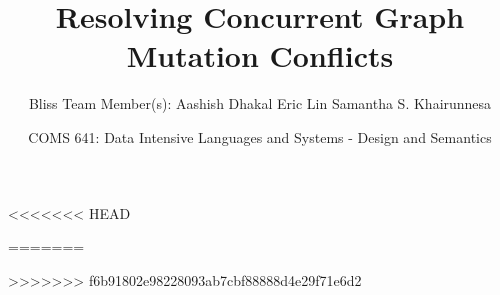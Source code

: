 \documentclass[hyperref={pdfpagelabels=false}]{beamer}
\title[641 Project]{Resolving Concurrent Graph Mutation Conflicts}
\author[Team Bliss]{Bliss
\linebreak Team Member(s):
\linebreak Aashish Dhakal
\linebreak Eric Lin
\linebreak Samantha S. Khairunnesa}
\institute[ISU]{Department of Computer Science \linebreak Iowa State
University}
\date[COMS 641]{COMS 641: Data Intensive Languages and Systems - Design and Semantics}
\begin{document}
  \begin{frame}[plain]
    \titlepage
  \end{frame}
  
  
<<<<<<< HEAD
  
  
=======
  
  
>>>>>>> f6b91802e98228093ab7cbf88888d4e29f71e6d2
\end{document}
